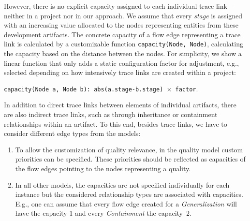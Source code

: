 However, there is no explicit capacity assigned to each individual trace link---neither in a project nor in our approach.
We assume that every \emph{stage} is assigned with an increasing value allocated to the nodes representing entities from these development artifacts.
The concrete capacity of a flow edge representing a trace link is calculated by a customizable function \texttt{capacity(Node, Node)}, calculating the capacity based on the distance between the nodes.
For simplicity, we show a linear function that only adds a static configuration factor for adjustment, e.g., selected depending on how intensively trace links are created within a project:

\begin{small}
\begin{description}
\item
\texttt{capacity(Node a, Node b): abs(a.stage-b.stage) $\times$ factor}.
\end{description}
\end{small}

In addition to direct trace links between elements of individual artifacts, there are also indirect trace links, such as through inheritance or containment relationships within an artifact.
To this end, besides trace links, we have to consider different edge types from the models: %

\begin{enumerate}[label=\alph*)]
    \item To allow the customization of quality relevance, in the quality model custom priorities can be specified.
    These priorities should be reflected as capacities of the flow edges pointing to the nodes representing a quality.
    \item In all other models, the capacities are not specified individually %
    for each instance but the considered relationship types are associated with capacities.
    E.g., one can assume that every flow edge created for a \textit{Generalization} will have the capacity 1 and every \textit{Containment} %
    the capacity~2.
\end{enumerate}

